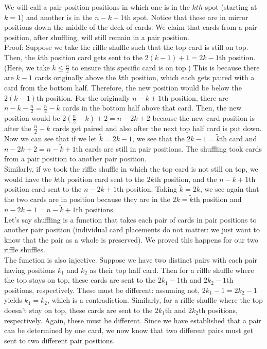\documentclass{amsart}
\begin{document}
\begin{enumerate}[itemsep=0.4in]
We will call a pair position positions in which one is in the $kth$ spot (starting at $k=1$) and another is in the $n-k+1$th spot. Notice that these are in mirror positions down the middle of the deck of cards. We claim that cards from a pair position, after shuffling, will still remain in a pair position.\\

Proof: Suppose we take the riffle shuffle such that the top card is still on top. Then, the $k$th position card gets sent to the $2(k-1)+1=2k-1$th position. (Here, we take $k\leq\frac n2$ to ensure this specific card is on top.) This is because there are $k-1$ cards originally above the $k$th position, which each gets paired with a card from the bottom half. Therefore, the new position would be below the $2(k-1)$th position. For the originally $n-k+1$th position, there are $n-k-\frac n2=\frac n2-k$ cards in the bottom half above that card. Then, the new position would be $2(\frac n2-k)+2=n-2k+2$ because the new card position is after the $\frac n2-k$ cards get paired and also after the next top half card is put down. Now we can see that if we let $\tilde{k}=2k-1$, we see that the $2k-1=\tilde{k}$th card and $n-2k+2=n-\tilde{k}+1$th cards are still in pair positions. The shuffling took cards from a pair position to another pair position. \\

Similarly, if we took the riffle shuffle in which the top card is not still on top, we would have the $k$th position card sent to the $2k$th position, and the $n-k+1$th position card sent to the $n-2k+1$th position. Taking $\tilde{k}=2k$, we see again that the two cards are in position because they are in the $2k=\tilde{k}$th position and $n-2k+1=n-\tilde{k}+1$th positions.\\

Let's say shuffling is a function that takes each pair of cards in pair positions to another pair position (individual card placements do not matter: we just want to know that the pair as a whole is preserved). We proved this happens for our two riffle shuffles.\\

The function is also injective. Suppose we have two distinct pairs with each pair having positions $k_1$ and $k_2$ as their top half card. Then for a riffle shuffle where the top stays on top, these cards are sent to the $2k_1-1$th and $2k_2-1$th positions, respectively. These must be different: assuming not, $2k_1-1=2k_2-1$ yields $k_1=k_2$, which is a contradiction. Similarly, for a riffle shuffle where the top doesn't stay on top, these cards are sent to the $2k_1$th and $2k_2$th positions, respectively. Again, these must be different. Since we have established that a pair can be determined by one card, we now know that two different pairs must get sent to two different pair positions.\\


\end{enumerate}
\end{document}

